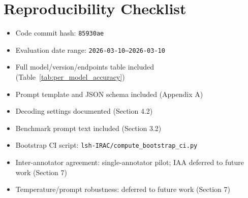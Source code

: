 \documentclass[11pt]{article}
\begin{document}
\section*{Reproducibility Checklist}
\begin{itemize}[leftmargin=1.5em]
    \item[$\checkmark$] Code commit hash: \texttt{85930ae}
    \item[$\checkmark$] Evaluation date range: \texttt{2026-03-10--2026-03-10}
    \item[$\checkmark$] Full model/version/endpoints table included (Table~\ref{tab:per_model_accuracy})
    \item[$\checkmark$] Prompt template and JSON schema included (Appendix A)
    \item[$\checkmark$] Decoding settings documented (Section 4.2)
    \item[$\checkmark$] Benchmark prompt text included (Section 3.2)
    \item[$\checkmark$] Bootstrap CI script: \texttt{lsh-IRAC/compute\_bootstrap\_ci.py}
    \item[$\circ$] Inter-annotator agreement: single-annotator pilot; IAA deferred to future work (Section 7)
    \item[$\circ$] Temperature/prompt robustness: deferred to future work (Section 7)
\end{itemize}
\end{document}
